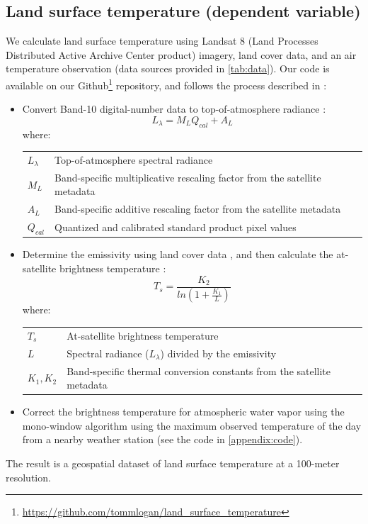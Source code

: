 \documentclass[final,3p,times,onecolumn,sort&compress]{elsarticle}
\makeatletter
\newenvironment{conditions}
  {\par\vspace{\abovedisplayskip}\noindent\begin{tabular}{>{$}l<{$} @{${}={}$} l}}
  {\end{tabular}\par\vspace{\belowdisplayskip}}
\makeatother
\begin{document}
\subsection{Land surface temperature (dependent variable)}
We calculate land surface temperature using Landsat 8 (Land Processes Distributed Active Archive Center product) imagery, land cover data, and an air temperature observation (data sources provided in \ref{tab:data}). 
Our code is available on our Github\footnote{\url{https://github.com/tommlogan/land_surface_temperature}} repository, and follows the process described in \cite{Scott2016-lc}:
\begin{itemize}
    \item 
        Convert Band-10 digital-number data to top-of-atmosphere radiance \citep{Jimenez-Munoz2003-wc}: 
        \begin{equation}
        \label{eqn:convert_TOA}
        L_\lambda = M_L Q_{cal} + A_L
        \end{equation}
        where:
        \begin{conditions}
         L_\lambda & Top-of-atmosphere spectral radiance \\
         M_L &  Band-specific multiplicative rescaling factor from the satellite metadata \\   
         A_L &  Band-specific additive rescaling factor from the satellite metadata \\   
         Q_{cal} &  Quantized and calibrated standard product pixel values
        \end{conditions}
    \item Determine the emissivity using land cover data \citep{Alipour2003-ym}, and then calculate the at-satellite brightness temperature \citep{Jimenez-Munoz2003-wc}: 
        \begin{equation}
        \label{eqn:at_sat}
        T_s = \frac{K_2}{ln(1 + \frac{K_1}{L})}
        \end{equation}
        where:
        \begin{conditions}
         T_s & At-satellite brightness temperature \\
         L &  Spectral radiance ($L_\lambda$) divided by the emissivity \\   
         K_1, K_2 & Band-specific thermal conversion constants from the satellite metadata
        \end{conditions}
    \item Correct the brightness temperature for atmospheric water vapor using the mono-window algorithm \citep{Qin2001-jn} using the maximum observed temperature of the day from a nearby weather station (see the code in \ref{appendix:code}).
\end{itemize}
The result is a geospatial dataset of land surface temperature at a 100-meter resolution.
\end{document}
